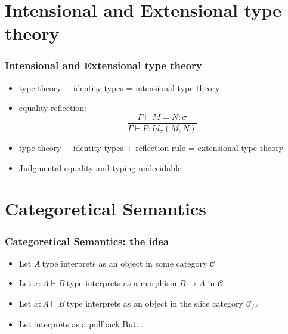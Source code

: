 \documentclass[aspectratio=169]{beamer}
\newcommand{\typ}{\ \mathrm{type}}
\newcommand{\Id}[2]{Id_\sigma(#1,#2)}
\begin{document}
    \section{Intensional and Extensional type theory}
    \begin{frame}
        \frametitle{Intensional and Extensional type theory}
        \begin{itemize}
            \item type theory + identity types = intensional type theory
            \item equality reflection:
            $$\frac{\Gamma \vdash M = N : \sigma}{\Gamma \vdash P: \Id{M}{N}}$$
            \item type theory + identity types + reflection rule = extensional type theory
            \item Judgmental equality and typing undecidable
        \end{itemize}
    \end{frame}
    \section{Categoretical Semantics}
    \begin{frame}
        \frametitle{Categoretical Semantics: the idea}
        \begin{itemize}
            \item Let $A \typ$ interprets as an object in some category $\mathcal{C}$
            \item Let $x: A \vdash B \typ$ interprets as a morphism $B \rightarrow A$ in $\mathcal{C}$
            \item Let $x: A \vdash B \typ$ interprets as an object in the slice category $\mathcal{C}_{/A}$
            \item Let interprets as a pullback
            But...
        \end{itemize}
    \end{frame}
\end{document}
